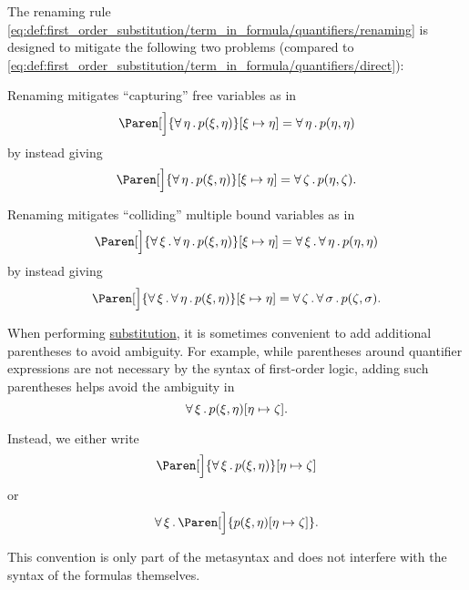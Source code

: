 \begin{remark}\label{rem:first_order_substitution_renaming_justification}
  The renaming rule \eqref{eq:def:first_order_substitution/term_in_formula/quantifiers/renaming} is designed to mitigate the following two problems (compared to \eqref{eq:def:first_order_substitution/term_in_formula/quantifiers/direct}):

  \begin{RemEnum}
     Renaming mitigates \enquote{capturing} free variables as in
    \begin{equation*}
      \Paren[\Big]{ \ForAll{\eta} p(\xi, \eta) }[\xi \mapsto \eta] = \ForAll{\eta} p(\eta, \eta)
    \end{equation*}
    by instead giving
    \begin{equation*}
      \Paren[\Big]{ \ForAll{\eta} p(\xi, \eta) }[\xi \mapsto \eta] = \ForAll{\zeta} p(\eta, \zeta).
    \end{equation*}

     Renaming mitigates \enquote{colliding} multiple bound variables as in
    \begin{equation*}
      \Paren[\Big]{ \ForAll{\xi} \ForAll{\eta} p(\xi, \eta) }[\xi \mapsto \eta] = \ForAll{\xi} \ForAll{\eta} p(\eta, \eta)
    \end{equation*}
    by instead giving
    \begin{equation*}
      \Paren[\Big]{ \ForAll{\xi} \ForAll{\eta} p(\xi, \eta) }[\xi \mapsto \eta] = \ForAll{\zeta} \ForAll{\sigma} p(\zeta, \sigma).
    \end{equation*}
  \end{RemEnum}
\end{remark}

\begin{remark}\label{rem:first_order_substitution_parentheses}
  When performing \hyperref[def:propositional_substitution]{substitution}, it is sometimes convenient to add additional parentheses to avoid ambiguity. For example, while parentheses around quantifier expressions are not necessary by the syntax of first-order logic, adding such parentheses helps avoid the ambiguity in
  \begin{equation*}
    \forall \, \xi \, . \, p(\xi, \eta) [\eta \mapsto \zeta].
  \end{equation*}

  Instead, we either write
  \begin{equation*}
    \Paren[\Big]{ \ForAll{\xi} p(\xi, \eta) } [\eta \mapsto \zeta]
  \end{equation*}
  or
  \begin{equation*}
    \ForAll{\xi} \Paren[\Big]{ p(\xi, \eta)[\eta \mapsto \zeta] }.
  \end{equation*}

  This convention is only part of the metasyntax and does not interfere with the syntax of the formulas themselves.
\end{remark}

